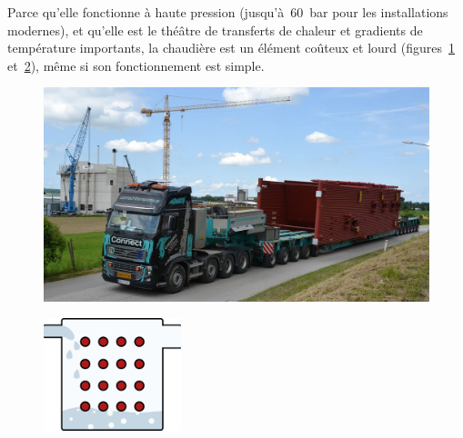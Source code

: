 		Parce qu’elle fonctionne à haute pression (jusqu’à~\SI{60}{\bar} pour les installations modernes), et qu’elle est le théâtre de transferts de chaleur et gradients de température importants, la chaudière est un élément coûteux et lourd (figures~\ref{fig_centrale_chaudiere1} et~\ref{fig_centrale_chaudiere2}), même si son fonctionnement est simple.

		\begin{figure}
			\begin{center}
				\includegraphics[width=\textwidth]{images/centrale_chaudiere_photo.jpg}
			\end{center}
			\label{fig_centrale_chaudiere1}
		\end{figure}

		\begin{figure}
			\begin{center}
				\includegraphics[width=4cm]{images/symbole_chaudiere.png}
			\end{center}
			\label{fig_centrale_chaudiere2}
		\end{figure}
		
